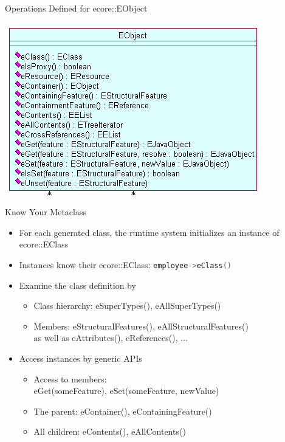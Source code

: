 \documentclass[pdf, 10pt]{beamer}
\begin{document}
\begin{frame}{Operations Defined for ecore::EObject}
\begin{center}
\includegraphics[width=\linewidth,height=0.8\textheight,keepaspectratio]{EMF/EObjectOperations-focused.png}
\end{center}
\end{frame}

\begin{frame}{Know Your Metaclass}
  \begin{itemize}
  \item For each generated class, the runtime system initializes an instance
    of ecore::EClass
  \item Instances know their ecore::EClass: 
    \lstinline[language=C++,basicstyle=\ttfamily,keywordstyle=\color{blue}]{employee->eClass()}
  \item<2-> Examine the class definition by
    \begin{itemize}
    \item Class hierarchy: eSuperTypes(), eAllSuperTypes()
    \item Members: eStructuralFeatures(), eAllStructuralFeatures()\\
      as well as eAttributes(), eReferences(), ...
    \end{itemize}
  \item<3-> Access instances by generic APIs
    \begin{itemize}
    \item Access to members:\\eGet(someFeature), eSet(someFeature, newValue)
    \item The parent: eContainer(), eContainingFeature()
    \item All children: eContents(), eAllContents()
    \end{itemize}
  \end{itemize}
\end{frame}
\end{document}
